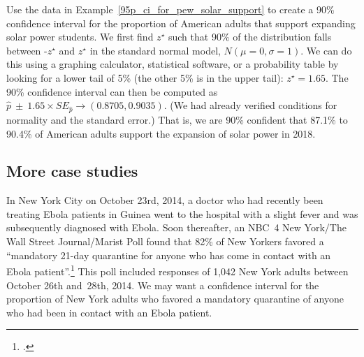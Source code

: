 \begin{example}{Use the data in
    Example~\ref{95p_ci_for_pew_solar_support} to
    create a 90\% confidence interval for the proportion of American
    adults that support expanding solar power students.}
  We first find $z^{\star}$ such that 90\% of the distribution falls
  between -$z^{\star}$ and $z^{\star}$ in the standard normal model,
  $N(\mu=0, \sigma=1)$. We can do this using a graphing calculator,
  statistical software, or a probability table by looking for a lower
  tail of 5\% (the other 5\% is in the upper tail): $z^{\star}=1.65$.
  The 90\% confidence interval can then be computed as
  $\hat{p}\ \pm\ 1.65\times SE_{\hat{p}} \to (0.8705, 0.9035)$.
  (We had already verified conditions for normality and the standard error.)
  That is, we are 90\% confident that 87.1\% to 90.4\% of American
  adults support the expansion of solar power in 2018.
\end{example}



\subsection{More case studies}


\newcommand{\wsjebolapollsize}{1042}
\newcommand{\wsjebolapollsizecomma}{1,042}
\newcommand{\wsjebolapollprop}{0.82}
\newcommand{\wsjebolapollpropcomplement}{0.18}
\newcommand{\wsjebolapollpercent}{82}
\newcommand{\wsjebolapollpercentcomplement}{18}
\newcommand{\wsjebolapollcount}{854}
\newcommand{\wsjebolapollcountcomplement}{188}
\newcommand{\wsjebolapollse}{0.012}


In New York City on October 23rd, 2014, a doctor who had recently been
treating Ebola patients in Guinea went to the hospital with a slight fever
and was subsequently diagnosed with Ebola. Soon thereafter,
an NBC~4 New York/The Wall Street Journal/Marist Poll found that
\wsjebolapollpercent{}\% of New Yorkers favored a ``mandatory 21-day
quarantine for anyone who has come in contact with an Ebola
patient''.\footnote{.} This poll included responses
of \wsjebolapollsizecomma{} New York adults between October 26th and~28th,
2014. We may want a confidence interval for the proportion of New York
adults who favored a mandatory quarantine of anyone who had been in
contact with an Ebola patient.

